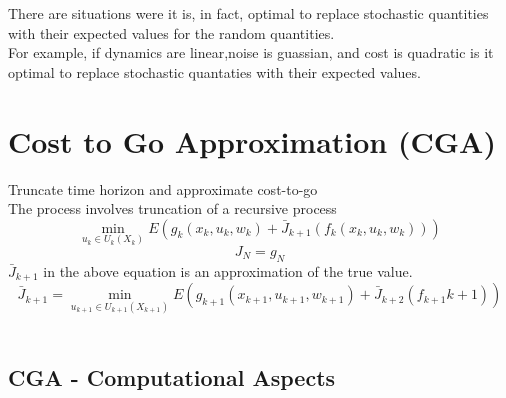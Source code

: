 \documentclass[twoside]{article}
\begin{document}
There are situations were it is, in fact, optimal to replace stochastic quantities with their expected values for the random quantities.\\
For example, if dynamics are linear,noise is guassian, and cost is quadratic is it optimal to replace stochastic quantaties with their expected values.

\section{Cost to Go Approximation (CGA)}
Truncate time horizon and approximate cost-to-go \\
The process involves truncation of a recursive process $$\min_{u_k \in U_k(X_k)}E(g_k(x_k,u_k,w_k) + \bar{J}_{k+1}(f_k(x_k,u_k,w_k)))$$$$
J_N =g_N$$
$$$$
$\bar{J}_{k+1}$ in the above equation is an approximation of the true value.
$$\bar{J}_{k+1} = \min_{u_{k+1} \in U_{k+1}(X_{k+1})}E(g_{k+1}(x_{k+1},u_{k+1},w_{k+1}) + \bar{J}_{k+2}(f_{k+1}{k+1}))$$
\\ \subsection{CGA - Computational Aspects}
\end{document}
